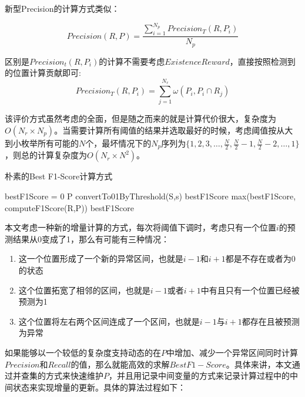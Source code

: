 新型Precision的计算方式类似：

\begin{equation*}
Precision(R,P) = \frac{\sum_{i=1}^{N_p}Precision_T(R,P_i)}{N_p}
\end{equation*}

区别是$Precision_t(R,P_i)$的计算不需要考虑$ExistenceReward$，直接按照检测到的位置计算贡献即可:
\begin{equation*}
Precision_T(R,P_i) = \sum_{j=1}^{N_r}\omega(P_i,P_i\cap R_j)
\end{equation*}

  该评价方式虽然考虑的全面，但是随之而来的就是计算代价很大，复杂度为$O(N_r\times N_p)$。当需要计算所有阈值的结果并选取最好的时候，考虑阈值按从大到小枚举所有可能的$N$个，最坏情况下的$N_p$序列为$\{1,2,3,\dots,\frac{N}{2},\frac{N}{2}-1,\frac{N}{2}-2,\dots,1\}$，则总的计算复杂度为$O(N_r\times N^2)$。

  \begin{algorithm}
  \caption{朴素的Best F1-Score计算方式}
  \begin{algorithmic}[1]
    \State bestF1Score = 0
    \State P \gets convertTo01ByThreshold(S,s)
    \State bestF1Score \gets max(bestF1Score, computeF1Score(R,P))
    \EndFor
    \State \Return bestF1Score
    \EndFunction
  \end{algorithmic}
  \end{algorithm}


  本文考虑一种新的增量计算的方式，每次将阈值下调时，考虑只有一个位置$i$的预测结果从0变成了1，那么有可能有三种情况：
  \begin{enumerate}
    \item 这一个位置形成了一个新的异常区间，也就是$i-1$和$i+1$都是不存在或者为0的状态
    \item 这个位置拓宽了相邻的区间，也就是$i-1$或者$i+1$中有且只有一个位置已经被预测为1
    \item 这个位置将左右两个区间连成了一个区间，也就是$i-1$与$i+1$都存在且被预测为异常
  \end{enumerate}

  如果能够以一个较低的复杂度支持动态的在$P$中增加、减少一个异常区间同时计算$Precision$和$Recall$的值，那么就能高效的求解$Best F1-Score$。具体来讲，本文通过并查集的方式来快速维护$P$，并且用记录中间变量的方式来记录计算过程中的中间状态来实现增量的更新。具体的算法过程如下：

